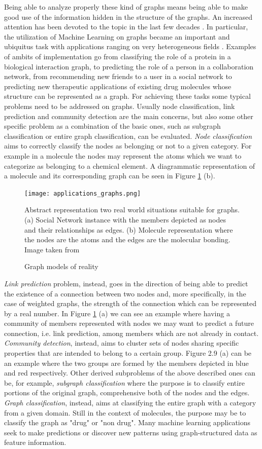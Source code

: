 Being able to analyze properly these kind of graphs means being able to make good use of the information hidden in the structure of the graphs. An increased attention has been devoted to the topic in the last few decades \cite{surveyGraphEmbedding}. In particular, the utilization of Machine Learning on graphs became an important and ubiquitus task with applications ranging on very heterogeneous fields  \cite{representationLearning}. Examples of ambits of implementation go from classifying the role of a protein in a biological interaction graph, to predicting the role of a person in a collaboration network, from recommending new friends to a user in a social network to predicting new therapeutic applications of existing drug molecules whose structure can be represented as a graph. For achieving these tasks some typical problems need to be addressed on graphs. Usually node classification, link prediction and community detection are the main concerns, but also some other specific problem as a combination of the basic ones, such as subgraph classification or entire graph classification, can be evaluated. \textit{Node classification} aims to correctly classify the nodes as belonging or not to a given category. For example in a molecule the nodes may represent the atoms which we want to categorize as belonging to a chemical element. A diagrammatic representation of a molecule and its corresponding graph can be seen in Figure \ref{fig:molecule} (b). 
\begin{figure}
\texttt{[image: applications\_graphs.png]}
\centering
\caption{Graph models of reality}
Abstract representation two real world situations suitable for graphs. (a) Social Network instance with the members depicted as nodes and their relationships as edges. (b) Molecule representation where the nodes are the atoms and the edges are the molecular bonding. Image taken from \cite{graph_deep_learning}
\label{fig:molecule}
\end{figure}
\textit{Link prediction} problem, instead, goes in the direction of being able to predict the existence of a connection between two nodes and, more specifically, in the case of weighted graphs, the strength of the connection which can be represented by a real number. In Figure \ref{fig:molecule} (a) we can see an example where having a community of members represented with nodes we may want to predict a future connection, i.e. link prediction, among members which are not already in contact. \textit{Community detection}, instead, aims to cluster sets of nodes sharing specific properties that are intended to belong to a certain group. Figure 2.9 (a) can be an example where the two groups are formed by the members depicted in blue and red respectively. Other derived subproblems of the above described ones can be, for example, \textit{subgraph classification} where the purpose is to classify entire portions of the original graph, comprehensive both of the nodes and the edges. \textit{Graph classification}, instead, aims at classifying the entire graph with a category from a given domain. Still in the context of molecules, the purpose may be to classify the graph as "drug" or "non drug". Many machine learning applications seek to make predictions or discover new patterns using graph-structured data as feature information.


